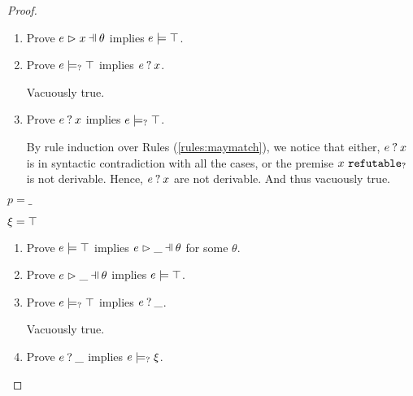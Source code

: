 \begin{proof}
\begin{byCases}
\begin{enumerate}
    \item Prove $\hpatmatch{e}{x}{\theta}$ implies $e \models \top$.
    \item Prove $e \models_{?} \top$ implies $e \mathbin{?} x$.
        Vacuously true.
    \item Prove $e \mathbin{?} x$ implies $e \models_{?} \top$.
    
        By rule induction over Rules (\ref{rules:maymatch}), we notice that either, $e \mathbin{?} x$ is in syntactic contradiction with all the cases, or the premise $x ~\mathtt{refutable}_?$ is not derivable. Hence, $e \mathbin{?} x$ are not derivable. And thus vacuously true.
    \end{enumerate}
    
\item[\text{(\ref{rule:PTWild})}]
    \begin{pfsteps*}
    \item $p=\_$ 
    \item $\xi=\top$ 
    \end{pfsteps*}
    \begin{enumerate}
    \item Prove $e \models \top$ implies $\hpatmatch{e}{\_}{\theta}$ for some $\theta$.
    \item Prove $\hpatmatch{e}{\_}{\theta}$ implies $e \models \top$.
    \item Prove $e \models_{?} \top$ implies $e \mathbin{?} \_$.
        Vacuously true.
    \item Prove $e \mathbin{?} \_$ implies $e \models_{?} \xi$.
    

\end{enumerate}
\end{byCases}
\end{proof}
